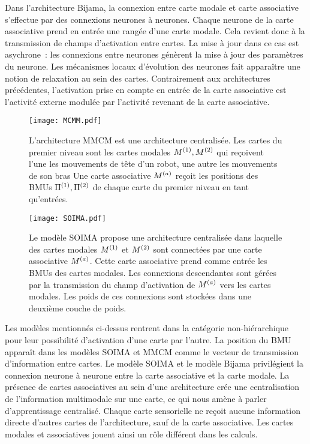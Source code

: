 \documentclass[../main]{subfiles}
\begin{document}
{Dans l'architecture Bijama, la connexion entre carte modale et carte associative s'effectue par des connexions neurones à neurones. Chaque neurone de la carte associative prend en entrée une rangée d'une carte modale. Cela revient donc à la transmission de champs d'activation entre cartes.
La mise à jour dans ce cas est asychrone~: les connexions entre neurones génèrent la mise à jour des paramètres du neurone. Les mécanismes locaux d'évolution des neurones fait apparaître une notion de relaxation au sein des cartes. 
Contrairement aux architectures précédentes, l'activation prise en compte en entrée de la carte associative est l'activité externe modulée par l'activité revenant de la carte associative.

\begin{figure}[t]
    \centering
    \texttt{[image: MCMM.pdf]}
    \caption{L'architecture MMCM \cite{dominey13} est une architecture centralisée.
    Les cartes du premier niveau sont les cartes modales $M^{({1})}, M^{({2})}$ qui reçoivent l'une les mouvements de tête d'un robot, une autre les mouvements de son bras
    Une carte associative $M^{({a})}$ reçoit les positions des BMUs $\Pi^{({1})},\Pi^{({2})}$ de chaque carte du premier niveau en tant qu'entrées. 
    \label{fig:mmcm}}
\end{figure}

\begin{figure}[t]
    \centering
    \texttt{[image: SOIMA.pdf]}
    \caption{Le modèle SOIMA \cite{escobar-juarez_self-organized_2016} propose une architecture centralisée dans laquelle des cartes modales $M^{({1})}$ et $M^{({2})}$ sont connectées par une carte associative $M^{({a})}$. Cette carte associative prend comme entrée les BMUs des cartes modales. 
    Les connexions descendantes sont gérées par la transmission du champ d'activation de $M^{({a})}$ vers les cartes modales. Les poids de ces connexions sont stockées dans une deuxième couche de poids.
    \label{fig:SOIMA}}
\end{figure}

Les modèles mentionnés ci-dessus rentrent dans la catégorie non-hiérarchique pour leur possibilité d'activation d'une carte par l'autre. 
La position du BMU apparaît dans les modèles SOIMA et MMCM comme le vecteur de transmission d'information  entre cartes.
Le modèle SOIMA et le modèle Bijama privilégient la connexion neurone à neurone entre la carte associative et la carte modale.
La présence de cartes associatives au sein d'une architecture crée une centralisation de l'information multimodale sur une carte, ce qui nous amène à parler d'apprentissage centralisé. Chaque carte sensorielle ne reçoit aucune information directe d'autres cartes de l'architecture, sauf de la carte associative.
Les cartes modales et associatives jouent ainsi un rôle différent dans les calculs.

}
\end{document}
